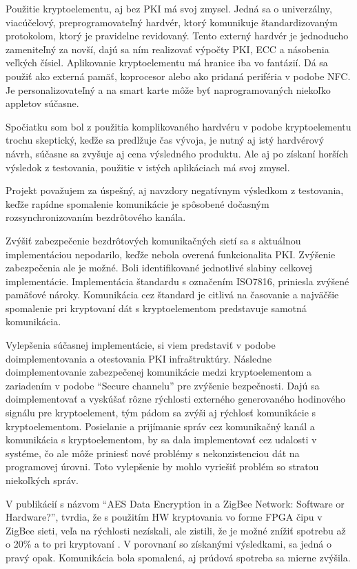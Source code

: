 \documentclass[12pt,a4paper,oneside,openright]{report}
\newcommand{\quotes}[1]{``#1''}
\begin{document}
Použitie kryptoelementu, aj bez PKI má svoj zmysel. Jedná sa o univerzálny, viacúčelový, preprogramovateľný hardvér, ktorý komunikuje štandardizovaným protokolom, ktorý je pravidelne revidovaný. Tento externý hardvér je jednoducho zameniteľný za novší, dajú sa ním realizovať výpočty PKI, ECC a násobenia veľkých čísiel. Aplikovanie kryptoelementu má hranice iba vo fantázií. Dá sa použiť ako externá pamäť, koprocesor alebo ako pridaná periféria v podobe NFC. Je personalizovateľný a na smart karte môže byť naprogramovaných niekoľko appletov súčasne.

Spočiatku som bol z použitia komplikovaného hardvéru v podobe kryptoelementu trochu skeptický, keďže sa predlžuje čas vývoja, je nutný aj istý hardvérový návrh, súčasne sa zvyšuje aj cena výsledného produktu. Ale aj po získaní horších výsledok z testovania, použitie v istých aplikáciach má svoj zmysel.

Projekt považujem za úspešný, aj navzdory negatívnym výsledkom z testovania, keďže rapídne spomalenie komunikácie je spôsobené dočasným rozsynchronizovaním bezdrôtového kanála.

Zvýšiť zabezpečenie bezdrôtových komunikačných sietí sa s aktuálnou implementáciou nepodarilo, keďže nebola overená funkcionalita PKI. Zvýšenie zabezpečenia ale je možné. Boli identifikované jednotlivé slabiny celkovej implementácie. Implementácia štandardu s označením ISO7816, priniesla zvýšené pamäťové nároky. Komunikácia cez štandard je citlivá na časovanie a najväčšie spomalenie pri kryptovaní dát s kryptoelementom predstavuje samotná komunikácia.

Vylepšenia súčasnej implementácie, si viem predstaviť v podobe doimplementovania a otestovania PKI infraštruktúry. Následne doimplementovanie zabezpečenej komunikácie medzi kryptoelementom a zariadením v podobe \quotes{Secure channelu} pre zvýšenie bezpečnosti. Dajú sa doimplementovať a vyskúšať rôzne rýchlosti externého generovaného hodinového signálu pre kryptoelement, tým pádom sa zvýši aj rýchlosť komunikácie s kryptoelementom. Posielanie a prijímanie správ cez komunikačný kanál a komunikácia s kryptoelementom, by sa dala implementovať cez udalosti v systéme, čo ale môže priniesť nové problémy s nekonzistenciou dát na programovej úrovni. Toto vylepšenie by mohlo vyriešiť problém so stratou niekoľkých správ.

V publikácií s názvom \quotes{AES Data Encryption in a ZigBee Network: Software or Hardware?}, tvrdia, že s použitím HW kryptovania vo forme FPGA čipu v ZigBee sieti, veľa na rýchlosti nezískali, ale zistili, že je možné znížiť spotrebu až o 20\% a to pri kryptovaní \cite{Ottoy2010}. V porovnaní so získanými výsledkami, sa jedná o pravý opak. Komunikácia bola spomalená, aj prúdová spotreba sa mierne zvýšila.
\end{document}
